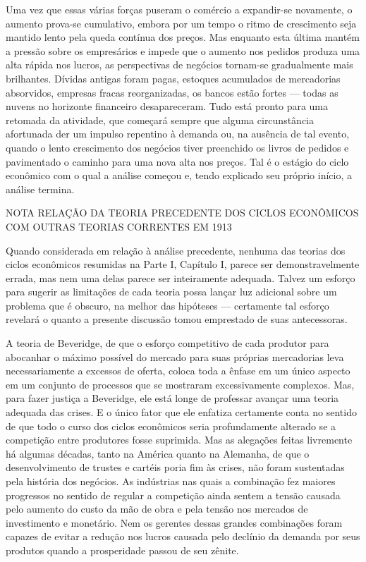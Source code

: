 \documentclass[12pt]{article}
\begin{document}
Uma vez que essas várias forças puseram o comércio a expandir-se novamente, o aumento prova-se cumulativo, embora por um tempo o ritmo de crescimento seja mantido lento pela queda contínua dos preços. Mas enquanto esta última mantém a pressão sobre os empresários e impede que o aumento nos pedidos produza uma alta rápida nos lucros, as perspectivas de negócios tornam-se gradualmente mais brilhantes. Dívidas antigas foram pagas, estoques acumulados de mercadorias absorvidos, empresas fracas reorganizadas, os bancos estão fortes — todas as nuvens no horizonte financeiro desapareceram. Tudo está pronto para uma retomada da atividade, que começará sempre que alguma circunstância afortunada der um impulso repentino à demanda ou, na ausência de tal evento, quando o lento crescimento dos negócios tiver preenchido os livros de pedidos e pavimentado o caminho para uma nova alta nos preços. Tal é o estágio do ciclo econômico com o qual a análise começou e, tendo explicado seu próprio início, a análise termina.

NOTA
RELAÇÃO DA TEORIA PRECEDENTE DOS CICLOS ECONÔMICOS COM OUTRAS TEORIAS CORRENTES EM 1913

Quando considerada em relação à análise precedente, nenhuma das teorias dos ciclos econômicos resumidas na Parte I, Capítulo I, parece ser demonstravelmente errada, mas nem uma delas parece ser inteiramente adequada. Talvez um esforço para sugerir as limitações de cada teoria possa lançar luz adicional sobre um problema que é obscuro, na melhor das hipóteses — certamente tal esforço revelará o quanto a presente discussão tomou emprestado de suas antecessoras.

A teoria de Beveridge, de que o esforço competitivo de cada produtor para abocanhar o máximo possível do mercado para suas próprias mercadorias leva necessariamente a excessos de oferta, coloca toda a ênfase em um único aspecto em um conjunto de processos que se mostraram excessivamente complexos. Mas, para fazer justiça a Beveridge, ele está longe de professar avançar uma teoria adequada das crises. E o único fator que ele enfatiza certamente conta no sentido de que todo o curso dos ciclos econômicos seria profundamente alterado se a competição entre produtores fosse suprimida. Mas as alegações feitas livremente há algumas décadas, tanto na América quanto na Alemanha, de que o desenvolvimento de trustes e cartéis poria fim às crises, não foram sustentadas pela história dos negócios. As indústrias nas quais a combinação fez maiores progressos no sentido de regular a competição ainda sentem a tensão causada pelo aumento do custo da mão de obra e pela tensão nos mercados de investimento e monetário. Nem os gerentes dessas grandes combinações foram capazes de evitar a redução nos lucros causada pelo declínio da demanda por seus produtos quando a prosperidade passou de seu zênite.
\end{document}
